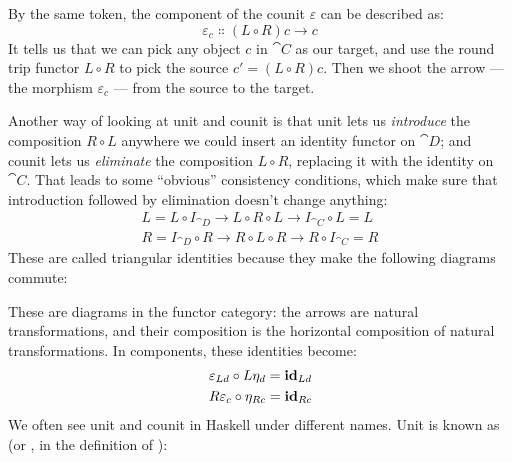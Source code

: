 \noindent
By the same token, the component of the counit $\varepsilon$ can be described as:
\[\varepsilon_{c} \Colon (L \circ R) c \to c\]
It tells us that we
can pick any object $c$ in $\cat{C}$ as our target, and use the
round trip functor $L \circ R$ to pick the source
$c' = (L \circ R) c$. Then we shoot the arrow --- the morphism
$\varepsilon_{c}$ --- from the source to the target.

Another way of looking at unit and counit is that unit lets us
\emph{introduce} the composition $R \circ L$ anywhere we could
insert an identity functor on $\cat{D}$; and counit lets us
\emph{eliminate} the composition $L \circ R$, replacing it with the
identity on $\cat{C}$. That leads to some ``obvious'' consistency
conditions, which make sure that introduction followed by elimination
doesn't change anything:
\begin{gather*}
  L = L \circ I_{\cat{D}} \to L \circ R \circ L \to I_{\cat{C}} \circ L = L \\
  R = I_{\cat{D}} \circ R \to R \circ L \circ R \to R \circ I_{\cat{C}} = R
\end{gather*}
These are called triangular identities because they make the following
diagrams commute:

\begin{figure}[H]
  \centering

  \begin{subfigure}
    \centering
  \end{subfigure}%
  \hspace{1cm}
  \begin{subfigure}
    \centering
  \end{subfigure}
\end{figure}

\noindent
These are diagrams in the functor category: the arrows are natural
transformations, and their composition is the horizontal composition of
natural transformations. In components, these identities become:
\begin{gather*}
  \varepsilon_{L d} \circ L \eta_d = \mathbf{id}_{L d} \\
  R \varepsilon_{c} \circ \eta_{R c} = \mathbf{id}_{R c}
\end{gather*}
We often see unit and counit in Haskell under different names. Unit is
known as  (or , in the definition of
):

